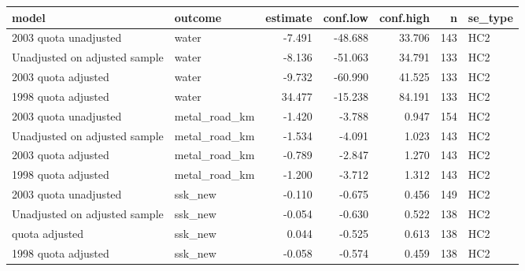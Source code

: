 
\begin{tabular}{llrrrrl}
\toprule
model & outcome & estimate & conf.low & conf.high & n & se\_type\\
\midrule
2003 quota unadjusted & water & -7.491 & -48.688 & 33.706 & 143 & HC2\\
Unadjusted on adjusted sample & water & -8.136 & -51.063 & 34.791 & 133 & HC2\\
2003 quota adjusted & water & -9.732 & -60.990 & 41.525 & 133 & HC2\\
1998 quota adjusted & water & 34.477 & -15.238 & 84.191 & 133 & HC2\\
2003 quota unadjusted & metal\_road\_km & -1.420 & -3.788 & 0.947 & 154 & HC2\\
\addlinespace
Unadjusted on adjusted sample & metal\_road\_km & -1.534 & -4.091 & 1.023 & 143 & HC2\\
2003 quota adjusted & metal\_road\_km & -0.789 & -2.847 & 1.270 & 143 & HC2\\
1998 quota adjusted & metal\_road\_km & -1.200 & -3.712 & 1.312 & 143 & HC2\\
2003 quota unadjusted & ssk\_new & -0.110 & -0.675 & 0.456 & 149 & HC2\\
Unadjusted on adjusted sample & ssk\_new & -0.054 & -0.630 & 0.522 & 138 & HC2\\
\addlinespace
2003 quota adjusted & ssk\_new & 0.044 & -0.525 & 0.613 & 138 & HC2\\
1998 quota adjusted & ssk\_new & -0.058 & -0.574 & 0.459 & 138 & HC2\\
\bottomrule
\end{tabular}
